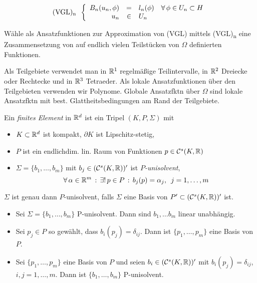\documentclass{cheat-sheet}
\newcommand{\Cont}{\mathcal{C}} %
\newcommand{\tss}[1]{\textsubscript{#1}} %
\begin{document}
\[
  \text{(VGL)\tss{n}} \enspace
  \left\{
  \begin{array}{r c l l}
    B_n(u_n, \phi) &=& l_n(\phi) & \forall \, \phi \in U_n \subset H \\
    u_n &\in& U_n
  \end{array}
  \right.
\]

\begin{idee}
  Wähle als Ansatzfunktionen zur Approximation von (VGL) mittels (VGL)\tss{n} eine Zusammensetzung von auf endlich vielen Teilstücken von $\Omega$ definierten Funktionen.
\end{idee}

\begin{bem}
  Als Teilgebiete verwendet man
  in $\mathbb{R}^1$ regelmäßige Teilintervalle, 
  in $\mathbb{R}^2$ Dreiecke oder Rechtecke und
  in $\mathbb{R}^3$ Tetraeder.
  Als lokale Ansatzfunktionen über den Teilgebieten verwenden wir Polynome.
  Globale Ansatzfktn über $\Omega$ sind lokale Ansatzfktn mit best. Glattheitsbedingungen am Rand der Teilgebiete.
\end{bem}

\begin{defn}
  Ein \emph{finites Element} in $\mathbb{R}^d$ ist ein Tripel $(K, P, \Sigma)$ mit %
  \begin{itemize}
    \item $K \subset \mathbb{R}^d$ ist kompakt, $\partial K$ ist Lipschitz-stetig,
    \item $P$ ist ein endlichdim. lin. Raum von Funktionen $p \in \Cont^s(K, \R)$
    \item $\Sigma = \{ b_1, \ldots, b_m \}$ mit $b_j \in (\Cont^s(K, \R))'$ ist \emph{$P$-unisolvent}, \dh{}
    \[
      \forall \, {\alpha \in \mathbb{R}^m} \,:\, \exists! \, {p \in P} \,:\, b_j(p) = \alpha_j, \enspace j = 1, \ldots, m
    \]
  \end{itemize}
\end{defn}

\begin{bem}
  $\Sigma$ ist genau dann $P$-unisolvent, falls $\Sigma$ eine Basis von $P' \subset (\Cont^s(K, \R))'$ ist.
\end{bem}

\begin{bemn}
  \begin{itemize}
    \item Sei $\Sigma = \{ b_1, \ldots, b_m \}$ P-unisolvent.
    Dann sind $b_1, \ldots b_m$ linear unabhängig.
    \item Sei $p_j \in P$ so gewählt, dass $b_i(p_j) = \delta_{ij}$.
    Dann ist $\{ p_1, \ldots, p_m \}$ eine Basis von $P$.
    \item Sei $\{ p_1, \ldots, p_m \}$ eine Basis von $P$ und seien $b_i \in (\Cont^s(K, \R))'$ mit $b_i(p_j) = \delta_{ij}$, $i, j = 1, \ldots, m$.
    Dann ist $\{ b_1, \ldots, b_m \}$ P-unisolvent.
  \end{itemize}
\end{bemn}
\end{document}
